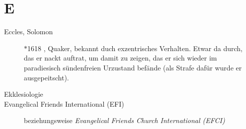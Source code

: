 \section*{E}

\articlesize

\begin{description}

 \item[Eccles, Solomon] $\ast$1618 , Quaker,  bekannt duch exzentrisches Verhalten. Etwar da durch, das er nackt auftrat, um damit zu zeigen, das er sich wieder im paradiesisch sündenfreien Urzustand befände (als Strafe dafür wurde er ausgepeitscht).

 \item[Ekklesiologie]

 \item[Evangelical Friends International (EFI)] beziehungsweise \textit{Evangelical Friends Church International (EFCI)}

 \end{description}

\normalsize

